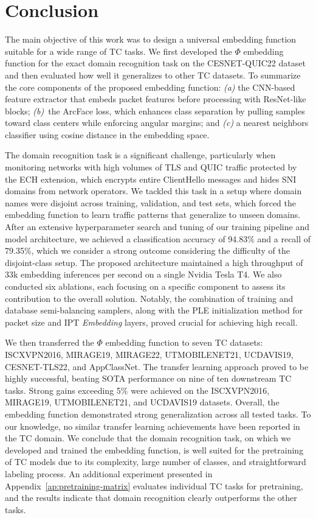 \documentclass[lettersize,journal,twoside,article]{IEEEtran}
\begin{document}
\section{Conclusion}
\label{sec:conclusion}
The main objective of this work was to design a universal embedding function suitable for a wide range of TC tasks. We first developed the $\Phi$ embedding function for the exact domain recognition task on the CESNET-QUIC22 dataset and then evaluated how well it generalizes to other TC datasets. To summarize the core components of the proposed embedding function: \textit{(a)} the CNN-based feature extractor that embeds packet features before processing with ResNet-like blocks; \textit{(b)}~the ArcFace loss, which enhances class separation by pulling samples toward class centers while enforcing angular margins; and \textit{(c)} a nearest neighbors classifier using cosine distance in the embedding space.


The domain recognition task is a significant challenge, particularly when monitoring networks with high volumes of TLS and QUIC traffic protected by the ECH extension, which encrypts entire ClientHello messages and hides SNI domains from network operators. We tackled this task in a setup where domain names were disjoint across training, validation, and test sets, which forced the embedding function to learn traffic patterns that generalize to unseen domains. After an extensive hyperparameter search and tuning of our training pipeline and model architecture, we achieved a classification accuracy of 94.83\% and a recall of 79.35\%, which we consider a strong outcome considering the difficulty of the disjoint-class setup. The proposed architecture maintained a high throughput of 33k embedding inferences per second on a single Nvidia Tesla T4. We also conducted six ablations, each focusing on a specific component to assess its contribution to the overall solution. Notably, the combination of training and database semi-balancing samplers, along with the PLE initialization method for packet size and IPT \textit{Embedding} layers, proved crucial for achieving high recall.

We then transferred the $\Phi$ embedding function to seven TC datasets: ISCXVPN2016, MIRAGE19, MIRAGE22, UTMOBILENET21, UCDAVIS19, CESNET-TLS22, and AppClassNet. The transfer learning approach proved to be highly successful, beating SOTA performance on nine of ten downstream TC tasks. Strong gains exceeding 5\% were achieved on the ISCXVPN2016, MIRAGE19, UTMOBILENET21, and UCDAVIS19 datasets. Overall, the embedding function demonstrated strong generalization across all tested tasks. To our knowledge, no similar transfer learning achievements have been reported in the TC domain. We conclude that the domain recognition task, on which we developed and trained the embedding function, is well suited for the pretraining of TC models due to its complexity, large number of classes, and straightforward labeling process. An additional experiment presented in Appendix~\ref{ap:pretraining-matrix} evaluates individual TC tasks for pretraining, and the results indicate that domain recognition clearly outperforms the other tasks.
\end{document}
